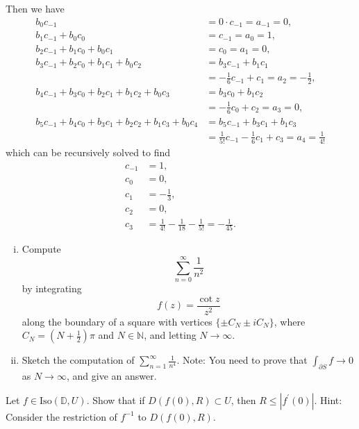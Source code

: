\documentclass{article}
\newcounter{Problem}
\newenvironment{Problem}{\begin{Exercise}[name={Problem},
                                          counter={Problem}]}
                        {\end{Exercise}}
\begin{document}
\begin{Answer}
Then we have
\begin{align*}
  b_0 c_{-1}
&= 0 \cdot c_{-1}
 =  a_{-1}
 =  0, \\
   b_1 c_{-1}
 + b_0 c_0
&= c_{-1}
 =  a_0  = 1, \\
   b_2 c_{-1}
 + b_1 c_0
 + b_0 c_1
&= c_0
 =  a_1 =  0, \\
   b_3 c_{-1}
 + b_2 c_0
 + b_1 c_1
 + b_0 c_2
&= b_3 c_{-1}
 + b_1 c_1 \\
&= -\frac{1}{6} c_{-1}
   + c_1
 =  a_2 = -\frac{1}{2}, \\
   b_4 c_{-1}
 + b_3 c_0
 + b_2 c_1
 + b_1 c_2
 + b_0 c_3
&= b_3 c_0
 + b_1 c_2 \\
&=  -\frac{1}{6} c_0
 + c_2
 =  a_3 = 0, \\
   b_5 c_{-1}
 + b_4 c_0
 + b_3 c_1
 + b_2 c_2
 + b_1 c_3
 + b_0 c_4
&= b_5 c_{-1}
 + b_3 c_1
 + b_1 c_3 \\
&= \frac{1}{5!} c_{-1}
 - \frac{1}{6} c_1
 + c_3
 =  a_4 = \frac{1}{4!}
\end{align*}
which can be recursively solved to find
\begin{align*}
c_{-1} &= 1, \\
c_0   &= 0, \\
c_1   &= -\frac{1}{3}, \\
c_2   &= 0, \\
c_3   &= \frac{1}{4!} - \frac{1}{18} - \frac{1}{5!}
       = -\frac{1}{45}.
\end{align*}
\end{Answer}

\begin{Problem}
  \begin{enumerate}[(i)]
    \item{
       Compute
       $$
       \sum_{n=0}^\infty \frac{1}{n^2}
       $$
       by integrating
       $$
       f(z) = \frac{\cot z}{z^2}
       $$
       along the boundary of a square with vertices
       $\{ \pm C_N \pm i C_N \}$, where $C_N = (N + \frac{1}{2})\pi$
       and $N \in \mathbb{N}$, and letting $N \to \infty$.
    }
    \item{
      Sketch the computation of
      $\sum_{n=1}^\infty \frac{1}{n^4}$. Note: You need to prove
      that $\int_{\partial S} f \to 0$ as $N \to \infty$, and give an answer.
    }
  \end{enumerate}
\end{Problem}

\begin{Problem}
Let $f \in \mathrm{Iso}(\mathbb{D}, U)$. Show that if
$D(f(0), R) \subset U$, then $R \leq |f^\prime(0)|$.
Hint: Consider the restriction of $f^{-1}$ to $D(f(0), R)$.
\end{Problem}
\end{document}
